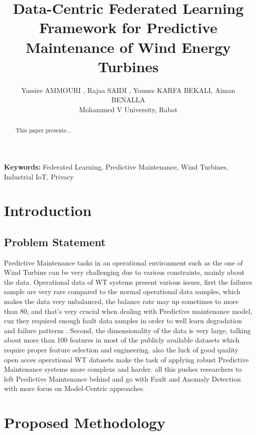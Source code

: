 \documentclass[12pt]{article}
\title{Data-Centric Federated Learning Framework for Predictive Maintenance of Wind Energy Turbines}
\author{Yassire AMMOURI , Rajaa SAIDI , Younes KARFA BEKALI, Aiman BENALLA\\ Mohammed V University, Rabat}
\date{}
\begin{document}
\maketitle

\begin{abstract}
This paper presents...
\end{abstract}

\textbf{Keywords:} Federated Learning, Predictive Maintenance, Wind Turbines, Industrial IoT, Privacy

\section{Introduction}
\subsection{Problem Statement }
Predictive Maintenance tasks in an operational environment such as the one of Wind Turbine can be very challenging due to various constraints, mainly about the data. Operational data of WT systems present various issues, first the failures sample are very rare compared to the normal operational data samples, which makes the data very unbalanced, the balance rate may up sometimes to more than 80, and that's very crucial when dealing with Predictive maintenance model, cuz they required enough fault data samples in order to well learn degradation and failure patterns . Second, the dimensionality of the data is very large, talking about more than 100 features in most of the publicly available datasets which require proper feature selection and engineering. also the luck of good quality open acces  operational WT datasets make the task of applying robust Predictive Maintenance systems more complexe and harder. all this pushes researchers to left Predictive Maintenance behind and go with Fault and Anomaly Detection with more focus on Model-Centric approaches.

\section{Proposed Methodology}
\end{document}

